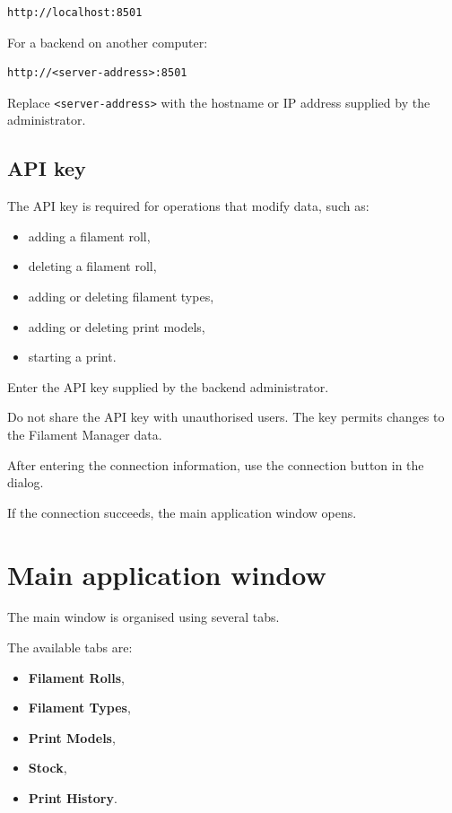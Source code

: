 \documentclass[a4paper,11pt]{article}
\begin{document}
\begin{lstlisting}
http://localhost:8501
\end{lstlisting}

For a backend on another computer:

\begin{lstlisting}
http://<server-address>:8501
\end{lstlisting}

Replace \texttt{<server-address>} with the hostname or IP address supplied by
the administrator.

\subsection{API key}

The API key is required for operations that modify data, such as:

\begin{itemize}
  \item adding a filament roll,
  \item deleting a filament roll,
  \item adding or deleting filament types,
  \item adding or deleting print models,
  \item starting a print.
\end{itemize}

Enter the API key supplied by the backend administrator.

\begin{warnbox}
Do not share the API key with unauthorised users. The key permits changes to
the Filament Manager data.
\end{warnbox}

After entering the connection information, use the connection button in the
dialog.

If the connection succeeds, the main application window opens.

\section{Main application window}

The main window is organised using several tabs.

The available tabs are:

\begin{itemize}
  \item \textbf{Filament Rolls},
  \item \textbf{Filament Types},
  \item \textbf{Print Models},
  \item \textbf{Stock},
  \item \textbf{Print History}.
\end{itemize}
\end{document}
